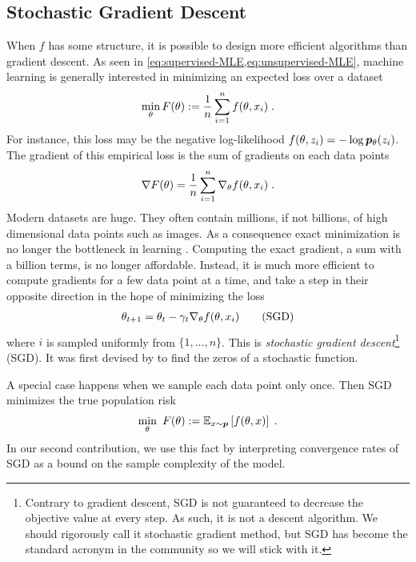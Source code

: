 \subsection{Stochastic Gradient Descent}
\label{ssec:SGD}
When $f$ has some structure, it is possible to design more efficient algorithms than gradient descent.
As seen in \cref{eq:supervised-MLE,eq:unsupervised-MLE}, machine learning is generally interested in minimizing an expected loss over a dataset
\begin{align}
    \min_\theta F(\theta) := \inv{n} \sum_{i=1}^n f(\theta, x_i) \; .
    \label{eq:finite-sum}
\end{align}
For instance, this loss may be the negative log-likelihood  $f(\theta, z_i) = - \log \bm{p}_{\theta}(z_i)$. 
The gradient of this empirical loss is the sum of gradients on each data points
\begin{align}
    \nabla F (\theta) = \frac{1}{n}\sum_{i=1}^n \nabla_\theta f(\theta, x_i) \; .
\end{align}
Modern datasets are huge. They often contain millions, if not billions, of high dimensional data points such as images. 
As a consequence exact minimization is no longer the bottleneck in learning \citep{bottou2008tradeoffs}. 
Computing the exact gradient, a sum with a billion terms, is no longer affordable.
Instead, it is much more efficient to compute gradients for a few data point at a time, and take a step in their opposite direction in the hope of minimizing the loss
\begin{align}
    \theta_{t+1} = \theta_t - \gamma_t \nabla_\theta f(\theta, x_i)
    \tag{SGD}
\end{align}
where $i$ is sampled uniformly from $\{1, \dots, n\}$.
This is \emph{stochastic gradient descent}\footnote{
	Contrary to gradient descent, SGD is not guaranteed to decrease the objective value at every step. 
	As such, it is not a descent algorithm. 
	We should rigorously call it stochastic gradient method, but SGD has become the standard acronym in the community so we will stick with it.
}
(SGD).
It was first devised by \citet{robbins1951stochastic} to find the zeros of a stochastic function.


A special case happens when we sample each data point only once.
Then  SGD minimizes the true population risk 
\begin{align}
    \min_\theta \ F(\theta) := \expect[x\sim \ptrue]{f(\theta, x)} \; .
    \label{eq:population-risk}
\end{align}
In our second contribution, we use this fact by interpreting convergence rates of SGD as a bound on the sample complexity of the model. 

